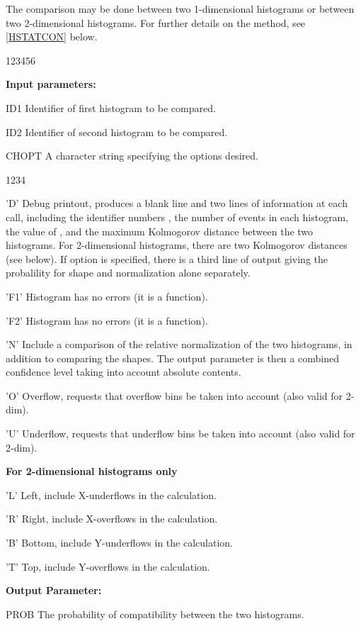 The comparison may be done between two 1-dimensional
histograms or between two 2-dimensional histograms.
For further details on the method, see \ref{HSTATCON}
below.
 
\begin{DLtt}{123456}
\item[{\rm\bf Input parameters:}]
\item[ID1] Identifier of first histogram to be compared.
\item[ID2] Identifier of second histogram to be compared.
\item[CHOPT] A character string specifying the options desired.
\begin{DLtt}{1234}
\item['D'] Debug printout, produces a blank line and two lines of
information at each call, including the identifier numbers ,
the number
of events in each histogram, the value of , and the maximum
Kolmogorov distance between the two histograms.
For 2-dimensional histograms,
there are two Kolmogorov distances (see below). If option  is
specified, there is a third line of output giving the probalility
for shape and normalization alone separately.
\item['F1'] Histogram  has no errors (it is a function).
\item['F2'] Histogram  has no errors (it is a function).
\item['N'] Include a comparison of the relative normalization
of the
two histograms, in addition to comparing the shapes.
The output parameter  is then
a combined confidence level taking into account absolute contents.
\item['O'] Overflow, requests that overflow bins be taken
into account (also valid for 2-dim).
\item['U'] Underflow, requests that underflow bins be taken
into account (also valid for 2-dim).
\item[{\rm\bf For 2-dimensional histograms only}]
\item['L'] Left, include X-underflows in the calculation.
\item['R'] Right, include X-overflows in the calculation.
\item['B'] Bottom, include Y-underflows in the calculation.
\item['T'] Top, include Y-overflows in the calculation.
\end{DLtt}
\item[{\rm\bf Output Parameter:}]
\item[PROB] The probability of compatibility between the two histograms.
\end{DLtt}
